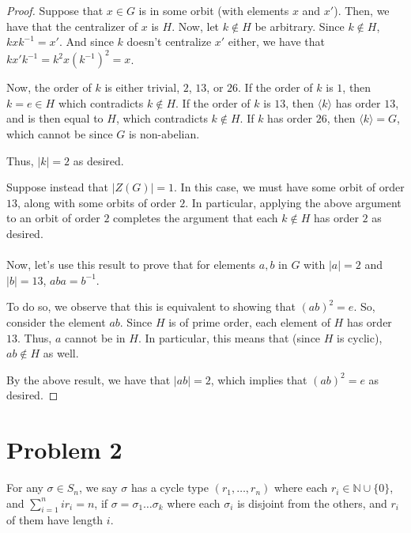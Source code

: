 \documentclass[12pt,reqno]{amsart}
\newcommand{\inv}{^{-1}}
\newcommand{\N}{\mathbb{N}}
\begin{document}
\begin{proof}
    Suppose that $x\in G$ is in some orbit (with elements $x$ and $x'$).
    Then, we have that the centralizer of $x$ is $H$. Now, let $k\not\in H$ be
    arbitrary. Since $k\not\in H$, $kxk\inv =x'$. And since $k$ doesn't
    centralize $x'$ either, we have that $kx'k\inv = k^2x(k\inv)^2 = x$.
    
    Now, the order of $k$ is either trivial, $2$, $13$, or $26$. If the order
    of $k$ is $1$, then $k=e\in H$ which contradicts $k\not\in H$. If the order
    of $k$ is $13$, then $\langle k \rangle$ has order $13$, and is then equal
    to $H$, which contradicts $k\not\in H$. If $k$ has order $26$, then $\langle
    k\rangle = G$, which cannot be since $G$ is non-abelian.
    
    Thus, $|k| = 2$ as desired.

    Suppose instead that $|Z(G)| = 1$. In this case, we must have some
    orbit of order $13$, along with some orbits of order $2$. In particular,
    applying the above argument to an orbit of order $2$ completes the argument
    that each $k\not\in H$ has order $2$ as desired.
    \\
    \\
    Now, let's use this result to prove that for elements $a,b$ in $G$ with
    $|a|=2$ and $|b|=13$, $aba=b\inv$.

    To do so, we observe that this is equivalent to showing that $(ab)^2 = e$.
    So, consider the element $ab$. Since $H$ is of prime order, each element of
    $H$ has order $13$. Thus, $a$ cannot be in $H$. In particular, this means
    that (since $H$ is cyclic), $ab\not\in H$ as well.

    By the above result, we have that $|ab| = 2$, which implies that
    $(ab)^2 = e$ as desired.
\end{proof}


\newpage

\section*{Problem 2}
For any $\sigma\in S_n$, we say $\sigma$ has a cycle type
$(r_1,\ldots,r_n)$ where each $r_i\in \N\cup\{0\}$, and $\sum_{i=1}^nir_i = n$,
if $\sigma = \sigma_1\ldots\sigma_k$ where each $\sigma_i$ is disjoint from the
others, and $r_i$ of them have length $i$.
\end{document}
